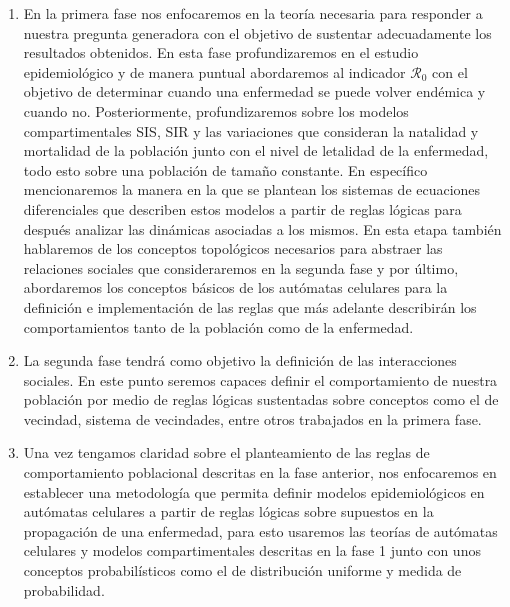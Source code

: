 \begin{enumerate}
    \item En la primera fase nos enfocaremos en la teoría necesaria para responder a nuestra pregunta generadora con el objetivo de sustentar adecuadamente los resultados obtenidos. En esta fase profundizaremos en el estudio epidemiológico y de manera puntual abordaremos al indicador $\mathcal{R}_0$ con el objetivo de determinar cuando una enfermedad se puede volver endémica y cuando no. Posteriormente, profundizaremos sobre los modelos compartimentales SIS, SIR y las variaciones que consideran la natalidad y mortalidad de la población junto con el nivel de letalidad de la enfermedad, todo esto sobre una población de tamaño constante. En específico mencionaremos la manera en la que se plantean los sistemas de ecuaciones diferenciales que describen estos modelos a partir de reglas lógicas para después analizar las dinámicas asociadas a los mismos.
    En esta etapa también hablaremos de los conceptos topológicos necesarios para abstraer las relaciones sociales que consideraremos en la segunda fase y por último, abordaremos los conceptos básicos de los autómatas celulares para la definición e implementación de las reglas que más adelante describirán los comportamientos tanto de la población como de la enfermedad.
    \item La segunda fase tendrá como objetivo la definición de las interacciones sociales. En este punto seremos capaces definir el comportamiento de nuestra población por medio de reglas lógicas sustentadas sobre conceptos como el de vecindad, sistema de vecindades, entre otros trabajados en la primera fase.
    \item Una vez tengamos claridad sobre el planteamiento de las reglas de comportamiento poblacional descritas en la fase anterior, nos enfocaremos en establecer una metodología que permita definir modelos epidemiológicos en autómatas celulares a partir de reglas lógicas sobre supuestos en la propagación de una enfermedad, para esto usaremos las teorías de autómatas celulares y modelos compartimentales descritas en la fase 1 junto con unos conceptos probabilísticos como el de distribución uniforme y medida de probabilidad. 
    

\end{enumerate}
